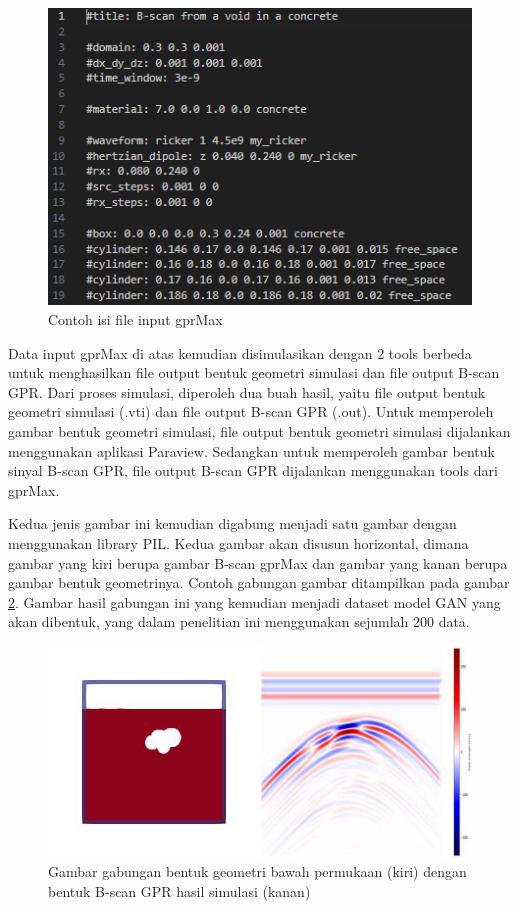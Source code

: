 \documentclass[conference]{IEEEtran}
\begin{document}
\begin{figure}[ht]
  \centering
  \includegraphics[scale=0.6]{gambar/inputGprMax.png}
  \caption{Contoh isi file input gprMax}
  \label{fig:inputgprMax}
\end{figure}

Data input gprMax di atas kemudian disimulasikan dengan 2 tools berbeda untuk menghasilkan file output bentuk geometri simulasi dan file output B-scan GPR. 
Dari proses simulasi, diperoleh dua buah hasil, yaitu file output bentuk geometri simulasi (.vti) dan file output B-scan GPR (.out). 
Untuk memperoleh gambar bentuk geometri simulasi, file output bentuk geometri simulasi dijalankan menggunakan aplikasi Paraview. 
Sedangkan untuk memperoleh gambar bentuk sinyal B-scan GPR, file output B-scan GPR dijalankan menggunakan tools dari gprMax.

Kedua jenis gambar ini kemudian digabung menjadi satu gambar dengan menggunakan library PIL. 
Kedua gambar akan disusun horizontal, dimana gambar yang kiri berupa gambar B-scan gprMax dan gambar yang kanan berupa gambar bentuk geometrinya. 
Contoh gabungan gambar ditampilkan pada gambar \ref{fig:contohdata}. 
Gambar hasil gabungan ini yang kemudian menjadi dataset model GAN yang akan dibentuk, yang dalam penelitian ini menggunakan sejumlah 200 data.

\begin{figure}[ht]
  \centering
  \includegraphics[scale=0.5]{gambar/data1.jpg}
  \caption{Gambar gabungan bentuk geometri bawah permukaan (kiri) dengan bentuk B-scan GPR hasil simulasi (kanan)}
  \label{fig:contohdata}
\end{figure}
\end{document}
